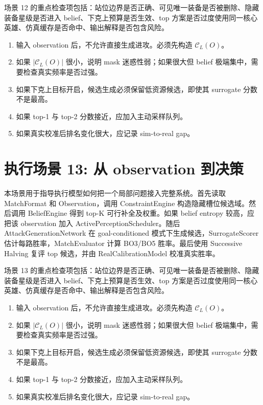 \documentclass[UTF8,12pt,openany]{ctexbook}
\newcommand{\Ccal}{\mathcal{C}}
\begin{document}
场景 12 的重点检查项包括：站位边界是否正确、可见唯一装备是否被删除、隐藏装备星级是否进入 belief、下克上预算是否生效、top 方案是否过度使用同一核心英雄、仿真缓存是否命中、输出解释是否包含风险。

\begin{enumerate}[leftmargin=2em]
\item 输入 observation 后，不允许直接生成进攻。必须先构造 $\Ccal_L(O)$。
\item 如果 $|\Ccal_L(O)|$ 很小，说明 mask 迷惑性弱；如果很大但 belief 极端集中，需要检查真实频率是否过强。
\item 如果下克上目标开启，候选生成必须保留低资源候选，即使其 surrogate 分数不是最高。
\item 如果 top-1 与 top-2 分数接近，应加入主动采样队列。
\item 如果真实校准后排名变化很大，应记录 sim-to-real gap。
\end{enumerate}


\section{执行场景 13: 从 observation 到决策}
本场景用于指导执行模型如何把一个局部问题接入完整系统。首先读取 MatchFormat 和 Observation，调用 ConstraintEngine 构造隐藏槽位候选域。然后调用 BeliefEngine 得到 top-K 可行补全及权重。如果 belief entropy 较高，应把该 observation 加入 ActivePerceptionScheduler。随后 AttackGenerationNetwork 在 goal-conditioned 模式下生成候选，SurrogateScorer 估计每路胜率，MatchEvaluator 计算 BO3/BO5 胜率。最后使用 Successive Halving 复评 top 候选，并由 RealCalibrationModel 校准真实胜率。

场景 13 的重点检查项包括：站位边界是否正确、可见唯一装备是否被删除、隐藏装备星级是否进入 belief、下克上预算是否生效、top 方案是否过度使用同一核心英雄、仿真缓存是否命中、输出解释是否包含风险。

\begin{enumerate}[leftmargin=2em]
\item 输入 observation 后，不允许直接生成进攻。必须先构造 $\Ccal_L(O)$。
\item 如果 $|\Ccal_L(O)|$ 很小，说明 mask 迷惑性弱；如果很大但 belief 极端集中，需要检查真实频率是否过强。
\item 如果下克上目标开启，候选生成必须保留低资源候选，即使其 surrogate 分数不是最高。
\item 如果 top-1 与 top-2 分数接近，应加入主动采样队列。
\item 如果真实校准后排名变化很大，应记录 sim-to-real gap。
\end{enumerate}
\end{document}
